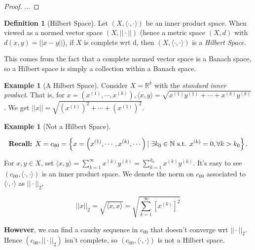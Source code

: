 \documentclass[11pt]{amsart}
\theoremstyle{definition}
\newtheorem{definition}[theorem]{Definition}
\newtheorem{example}[theorem]{Example}
\numberwithin{equation}{section}
\newcommand{\bN}{ \mathbb{N} }	%
\newcommand{\bR}{ \mathbb{R} }	%
\newcommand{\ips}{ \left( X, \langle \cdot, \cdot \rangle \right) }		%
\begin{document}
\begin{proof}
...
\end{proof}

\vspace{6pt}

\begin{definition}[Hilbert Space]	\label{def:15}
Let $\ips$ be an inner product space. When viewed as a normed vector space $\left( X, ||\cdot || \right)$ (hence a metric space $\left( X, d \right)$ with $d(x,y) = || x - y ||$), if $X$ is complete wrt d, then $\ips$ is a \textit{Hilbert Space}. 
\end{definition}

This comes from the fact that a complete normed vector space is a Banach space, so a Hilbert space is simply a collection within a Banach space. 

\vspace{6pt}

\begin{example}[A Hilbert Space]\label{ex:16}
Consider $X = \bR^k$ with the \textit{standard inner product}. That is, for $x = \left(x^{(1)}, \cdots, x^{(k)}\right), \langle x,y \rangle 
= \sqrt{x^{(1)}y^{(1)} + \cdots + x^{(k)}y^{(k)} } $. We get $||x|| 
= \sqrt{\left(x^{(1)}\right)^2 + \cdots + \left(x^{(1)}\right)^2}	$.
\end{example}

\vspace{6pt}

\begin{example}[Not a Hilbert Space]\label{ex:17}

$$\mbox{\textbf{Recall:} } X = c_{00} = \left\{ x = \left(x^{(1)}, \cdots, x^{(k)}, \cdots \right) | \; \exists k_0 \in \bN \mbox{ s.t. } x^{(k)} = 0,\\ \forall k > k_0\right\}. $$

For $x,y \in X$, set $\langle x,y \rangle = \sum_{k = 1}^{\infty} x^{(k)}y^{(k)} = \sum_{k = 1}^{k_0} x^{(k)}y^{(k)}$. It's easy to see $\left(c_{00}, \langle \cdot, \cdot \rangle \right)$ is an inner product space. We denote the norm on $c_{00}$ associated to $\langle \cdot, \cdot \rangle$ as $|| \cdot ||_2$,  

$$||x||_2 = \sqrt{ \langle x,x\rangle} = \sqrt{ \sum_{k = 1}^{\infty}\left[x^{(k)}\right]^2}$$
\vspace{6pt}

\textbf{However}, we can find a cauchy sequence in $c_{00}$ that doesn't converge wrt $||\cdot||_2$. Hence $ \left(c_{00}, ||\cdot ||_2\right) $ isn't complete, so $ \left(c_{00}, \langle \cdot , \cdot \rangle \right) $ is not a Hilbert space. 
\end{example}
\end{document}
